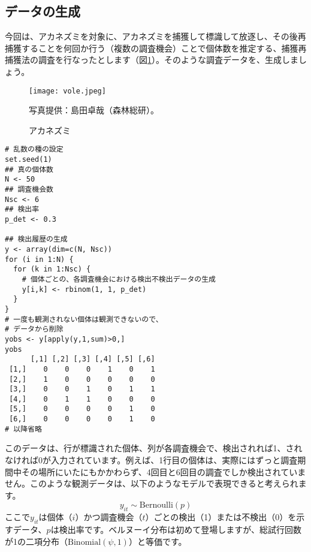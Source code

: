 		\subsection{データの生成}
今回は、アカネズミを対象に、アカネズミを捕獲して標識して放逐し、その後再捕獲することを何回か行う（複数の調査機会）ことで個体数を推定する、捕獲再捕獲法の調査を行なったとします（図\ref{vole}）。そのような調査データを、生成しましょう。
\begin{figure}[htb]
\graphicspath{{4_hm/figs/}}
\texttt{[image: vole.jpeg]}\\
\caption{アカネズミ}
\label{vole}
\scriptsize 写真提供：島田卓哉（森林総研）。
\end{figure}

\begin{verbatim}
# 乱数の種の設定
set.seed(1)
## 真の個体数
N <- 50
## 調査機会数
Nsc <- 6
## 検出率
p_det <- 0.3

## 検出履歴の生成
y <- array(dim=c(N, Nsc))
for (i in 1:N) {
  for (k in 1:Nsc) {
    # 個体ごとの、各調査機会における検出不検出データの生成
    y[i,k] <- rbinom(1, 1, p_det)
  }
}
# 一度も観測されない個体は観測できないので、
# データから削除
yobs <- y[apply(y,1,sum)>0,]
yobs
      [,1] [,2] [,3] [,4] [,5] [,6]
 [1,]    0    0    0    1    0    1
 [2,]    1    0    0    0    0    0
 [3,]    0    0    1    0    1    1
 [4,]    0    1    1    0    0    0
 [5,]    0    0    0    0    1    0
 [6,]    0    0    0    0    1    0
# 以降省略
\end{verbatim}
このデータは、行が標識された個体、列が各調査機会で、検出されれば1、されなければ0が入力されています。例えば、1行目の個体は、実際にはずっと調査期間中その場所にいたにもかかわらず、4回目と6回目の調査でしか検出されていません。このような観測データは、以下のようなモデルで表現できると考えられます。
\begin{equation}
y_{it} \sim \mathrm{Bernoulli}(p)
\end{equation}
ここで$y_{it}$は個体（$i$）かつ調査機会（$t$）ごとの検出（1）または不検出（0）を示すデータ、$p$は検出率です。ベルヌーイ分布は初めて登場しますが、総試行回数が1の二項分布（$\mathrm{Binomial}(\psi, 1)$）と等価です。

